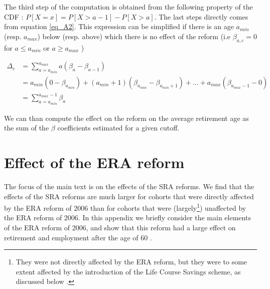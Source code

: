 \documentclass[12pt,a4paper]{article}
\begin{document}
The third step of the computation is obtained from the following property of the CDF : $P[X =  x] = P[X > a-1] - P[X > a] $. The last steps directly comes from equation \ref{eq_A2}. This expression can be simplified if there is an age $a_{min}$ (resp. $a_{max}$) below (resp. above) which there is no effect of the reform (i.e $\beta_{a,c} = 0 $ for $a \leq a_{min}$ or $a \geq a_{max}$  )

\begin{align*}
	\Delta_c & = \sum_{a = a_{min}}^{a_{max}} a ( \beta_{a} - \beta_{a-1}) \\
	& = a_{min}  (0 - \beta_{a_{min}}) + (a_{min}+1)  (\beta_{a_{min}} - \beta_{a_{min}+1} ) + ...  + a_{max}  (\beta_{a_{max}-1} - 0 ) \\
	&  = \sum_{a = a_{min}}^{a_{max}-1}  \beta_{a} 
\end{align*}

We can than compute the effect on the reform on the average retirement age as the sum of the $\beta$ coefficients estimated for a given cutoff. 

\clearpage


\section{Effect of the ERA reform}\label{appendix_era}

\setcounter{table}{0}
\setcounter{equation}{0}
\setcounter{figure}{0}
\renewcommand{\thefigure}{B.\arabic{figure}}
\renewcommand{\thetable}{B.\arabic{table}}
\renewcommand{\theequation}{B.\arabic{equation}}

The focus of the main text is on the effects of the SRA reforms. We find that the effects of the SRA reforms are much larger for cohorts that were directly affected by the ERA reform of 2006 than for cohorts that were (largely\footnote{They were not directly affected by the ERA reform, but they were to some extent affected by the introduction of the Life Course Savings scheme, as discussed below \citep[also see][]{lindeboom_montizaan_2020}.}) unaffected by the ERA reform of 2006. In this appendix we briefly consider the main elements of the ERA reform of 2006, and show that this reform had a large effect on retirement and employment after the age of 60 \citep[for earlier analyses of this reform see e.g.][]{de_grip_et_al_2012, lindeboom_montizaan_2020}. 
\end{document}
